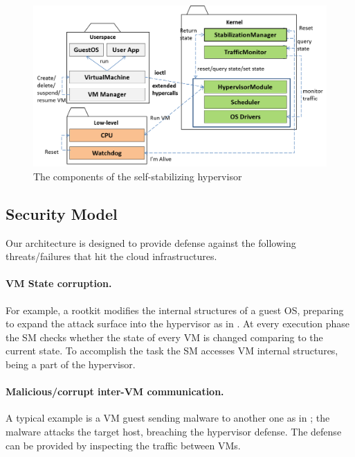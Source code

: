 \begin{figure}
\begin{centering}
\includegraphics[width=12cm]{pictures/overview}
\par\end{centering}

\caption{\label{fig:The-overview-figure}The components of the self-stabilizing
hypervisor}
\end{figure}



\subsection{Security Model }

Our architecture is designed to provide defense against the following
threats/failures that hit the cloud infrastructures. 


\paragraph{VM State corruption. }

For example, a rootkit modifies the internal structures of a guest
OS, preparing to expand the attack surface into the hypervisor as
in \cite{Wang:rootkits:2009}. At every execution phase the SM checks
whether the state of every VM is changed comparing to the current
state. To accomplish the task the SM accesses VM internal structures,
being a part of the hypervisor. 


\paragraph{Malicious/corrupt inter-VM communication. }

A typical example is a VM guest sending malware to another one as
in \cite{Srivastava:2008:TAB:1433006.1433011}; the malware attacks
the target host, breaching the hypervisor defense. The defense can
be provided by inspecting the traffic between VMs. 


